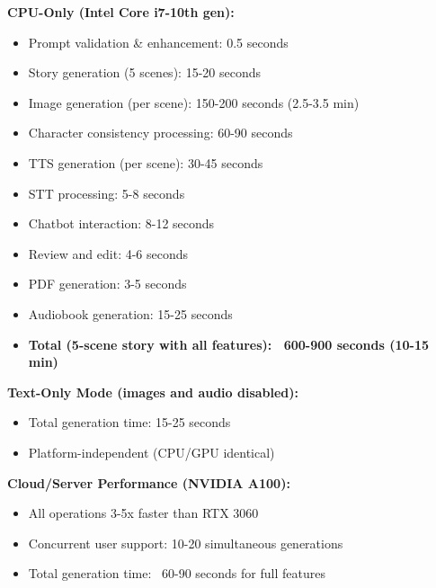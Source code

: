 {\textbf{CPU-Only (Intel Core i7-10th gen):}
\begin{itemize}
    \item Prompt validation \& enhancement: 0.5 seconds
    \item Story generation (5 scenes): 15-20 seconds
    \item Image generation (per scene): 150-200 seconds (2.5-3.5 min)
    \item Character consistency processing: 60-90 seconds
    \item TTS generation (per scene): 30-45 seconds
    \item STT processing: 5-8 seconds
    \item Chatbot interaction: 8-12 seconds
    \item Review and edit: 4-6 seconds
    \item PDF generation: 3-5 seconds
    \item Audiobook generation: 15-25 seconds
    \item \textbf{Total (5-scene story with all features): ~600-900 seconds (10-15 min)}
\end{itemize}

\textbf{Text-Only Mode (images and audio disabled):}
\begin{itemize}
    \item Total generation time: 15-25 seconds
    \item Platform-independent (CPU/GPU identical)
\end{itemize}

\textbf{Cloud/Server Performance (NVIDIA A100):}
\begin{itemize}
    \item All operations 3-5x faster than RTX 3060
    \item Concurrent user support: 10-20 simultaneous generations
    \item Total generation time: ~60-90 seconds for full features
\end{itemize}

}
